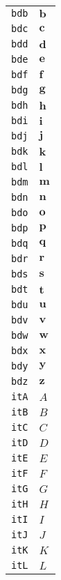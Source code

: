 \begin{longtable}{ll}
\texttt{bdb}&${}\textbf{b}{}$\\
\texttt{bdc}&${}\textbf{c}{}$\\
\texttt{bdd}&${}\textbf{d}{}$\\
\texttt{bde}&${}\textbf{e}{}$\\
\texttt{bdf}&${}\textbf{f}{}$\\
\texttt{bdg}&${}\textbf{g}{}$\\
\texttt{bdh}&${}\textbf{h}{}$\\
\texttt{bdi}&${}\textbf{i}{}$\\
\texttt{bdj}&${}\textbf{j}{}$\\
\texttt{bdk}&${}\textbf{k}{}$\\
\texttt{bdl}&${}\textbf{l}{}$\\
\texttt{bdm}&${}\textbf{m}{}$\\
\texttt{bdn}&${}\textbf{n}{}$\\
\texttt{bdo}&${}\textbf{o}{}$\\
\texttt{bdp}&${}\textbf{p}{}$\\
\texttt{bdq}&${}\textbf{q}{}$\\
\texttt{bdr}&${}\textbf{r}{}$\\
\texttt{bds}&${}\textbf{s}{}$\\
\texttt{bdt}&${}\textbf{t}{}$\\
\texttt{bdu}&${}\textbf{u}{}$\\
\texttt{bdv}&${}\textbf{v}{}$\\
\texttt{bdw}&${}\textbf{w}{}$\\
\texttt{bdx}&${}\textbf{x}{}$\\
\texttt{bdy}&${}\textbf{y}{}$\\
\texttt{bdz}&${}\textbf{z}{}$\\
\texttt{itA}&${}\textit{A}{}$\\
\texttt{itB}&${}\textit{B}{}$\\
\texttt{itC}&${}\textit{C}{}$\\
\texttt{itD}&${}\textit{D}{}$\\
\texttt{itE}&${}\textit{E}{}$\\
\texttt{itF}&${}\textit{F}{}$\\
\texttt{itG}&${}\textit{G}{}$\\
\texttt{itH}&${}\textit{H}{}$\\
\texttt{itI}&${}\textit{I}{}$\\
\texttt{itJ}&${}\textit{J}{}$\\
\texttt{itK}&${}\textit{K}{}$\\
\texttt{itL}&${}\textit{L}{}$\\

\end{longtable}
